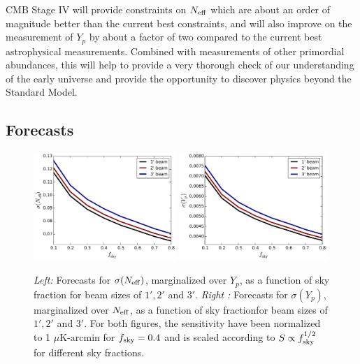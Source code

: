 CMB Stage IV will provide constraints on $N_{\rm eff}$ which are about an order of magnitude better than the current best constraints, and will also improve on the measurement of $Y_p$ by about a factor of two compared to the current best astrophysical measurements.  Combined with measurements of other primordial abundances, this will help to provide a very thorough check of our understanding of the early universe and provide the opportunity to discover physics beyond the Standard Model.

\subsection{Forecasts}\label{sec:NeffBBNfore}

\begin{figure}[t!]
\begin{center}
\includegraphics[width=0.48\textwidth]{Neutrinos/NfskyYp.pdf}
\includegraphics[width=0.5\textwidth]{Neutrinos/Ypfsky.pdf}
\caption{{\it Left:} Forecasts for $\sigma(N_{\rm eff})$, marginalized over $Y_p$, as a function of sky fraction for beam sizes of $1',2'$ and $3'$.  {\it Right :} Forecasts for $\sigma(Y_p)$, marginalized over $N_{\rm eff}$, as a function of sky fractionfor beam sizes of $1',2'$ and $3'$.  For both figures, the sensitivity have been normalized to 1 $\mu$K-arcmin for $f_{\rm sky} =0.4$ and is scaled according to $S \propto f_{\rm sky}^{1/2}$ for different sky fractions.}
\label{fig:YpNeff_fsky}
\end{center}
\end{figure} 

